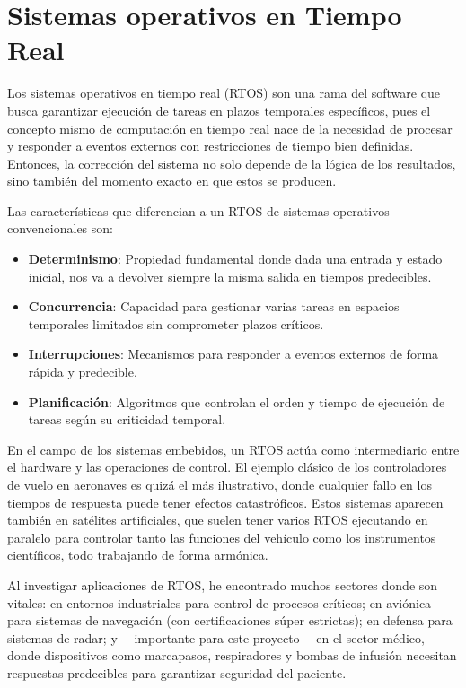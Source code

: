 \chapter{Sistemas operativos en Tiempo Real}\label{ch:real_time_oses}

Los sistemas operativos en tiempo real (RTOS) \cite{Siewert_Pratt_2016} son una rama del software que busca garantizar ejecución de tareas en plazos temporales específicos, pues el concepto mismo de computación en tiempo real nace de la necesidad de procesar y responder a eventos externos con restricciones de tiempo bien definidas. Entonces, la corrección del sistema no solo depende de la lógica de los resultados, sino también del momento exacto en que estos se producen.

Las características que diferencian a un RTOS de sistemas operativos convencionales son:

\begin{itemize}
    \item \textbf{Determinismo}: Propiedad fundamental donde dada una entrada y estado inicial, nos va a devolver siempre la misma salida en tiempos predecibles.
    \item \textbf{Concurrencia}: Capacidad para gestionar varias tareas en espacios temporales limitados sin comprometer plazos críticos.
    \item \textbf{Interrupciones}: Mecanismos para responder a eventos externos de forma rápida y predecible.
    \item \textbf{Planificación}: Algoritmos que controlan el orden y tiempo de ejecución de tareas según su criticidad temporal.
\end{itemize}

En el campo de los sistemas embebidos, un RTOS actúa como intermediario entre el hardware y las operaciones de control. El ejemplo clásico de los controladores de vuelo en aeronaves es quizá el más ilustrativo, donde cualquier fallo en los tiempos de respuesta puede tener efectos catastróficos. Estos sistemas aparecen también en satélites artificiales, que suelen tener varios RTOS ejecutando en paralelo para controlar tanto las funciones del vehículo como los instrumentos científicos, todo trabajando de forma armónica.

Al investigar aplicaciones de RTOS, he encontrado muchos sectores donde son vitales: en entornos industriales para control de procesos críticos; en aviónica para sistemas de navegación (con certificaciones súper estrictas); en defensa para sistemas de radar; y —importante para este proyecto— en el sector médico, donde dispositivos como marcapasos, respiradores y bombas de infusión necesitan respuestas predecibles para garantizar seguridad del paciente.

